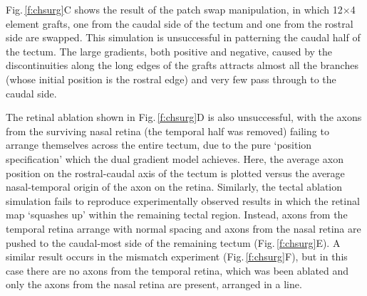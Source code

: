 \documentclass[11pt, a4paper]{article}
\begin{document}
Fig.\,\ref{f:chsurg}C shows the result of the patch swap manipulation, in
which 12$\times$4 element grafts, one from the caudal side of the tectum and one from
the rostral side are swapped. This simulation is unsuccessful in patterning
the caudal half of the tectum. The large gradients, both positive and
negative, caused by the discontinuities along the long edges of the grafts
attracts almost all the branches (whose initial position is the rostral edge)
and very few pass through to the caudal side.

The retinal ablation shown in Fig.\,\ref{f:chsurg}D is also unsuccessful, with
the axons from the surviving nasal retina (the temporal half was removed)
failing to arrange themselves across the entire tectum, due to the pure
`position specification' which the dual gradient model achieves. Here, the
average axon position on the rostral-caudal axis of the tectum is plotted versus the average
nasal-temporal origin of the axon on the retina. Similarly,
the tectal ablation simulation fails to reproduce experimentally observed
results in which the retinal map `squashes up' within the remaining tectal
region. Instead, axons from the temporal retina arrange with normal spacing
and axons from the nasal retina are pushed to the caudal-most side of the
remaining tectum (Fig.\,\ref{f:chsurg}E). A similar result occurs in the
mismatch experiment (Fig.\,\ref{f:chsurg}F), but in this case there are no
axons from the temporal retina, which was been ablated and only the axons
from the nasal retina are present, arranged in a line.
\end{document}
